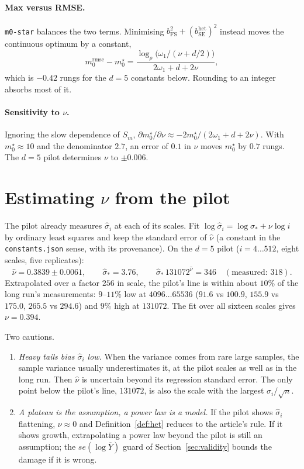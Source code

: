 \documentclass[11pt]{article}
\newcommand{\bSE}{b_{\mathrm{SE}}}
\newcommand{\bFS}{b_{\mathrm{FS}}}
\begin{document}
\paragraph{Max versus RMSE.} \texttt{m0-star} balances the two terms. Minimising
$\bFS^2+(\bSE^{\mathrm{het}})^2$ instead moves the continuous optimum by a
constant,
\[
  m_0^{\mathrm{rmse}}-m_0^\star=\frac{\log_\rho\bigl(\omega_1/(\nu+d/2)\bigr)}{2\omega_1+d+2\nu},
\]
which is $-0.42$ rungs for the $d=5$ constants below. Rounding to an integer
absorbs most of it.

\paragraph{Sensitivity to $\nu$.} Ignoring the slow dependence of $S_m$,
$\partial m_0^\star/\partial\nu\approx-2m_0^\star/(2\omega_1+d+2\nu)$. With
$m_0^\star\approx10$ and the denominator $2.7$, an error of $0.1$ in $\nu$ moves
$m_0^\star$ by $0.7$ rungs. The $d=5$ pilot determines $\nu$ to $\pm0.006$.

\section{Estimating \texorpdfstring{$\nu$}{nu} from the pilot}\label{sec:nu}

The pilot already measures $\hat\sigma_i$ at each of its scales. Fit
$\log\hat\sigma_i=\log\sigma_*+\nu\log i$ by ordinary least squares and keep
the standard error of $\hat\nu$ (a constant in the
\texttt{constants.json} sense, with its provenance). On the $d=5$ pilot
($i=4\ldots512$, eight scales, five replicates):
\[
  \hat\nu=0.3839\pm0.0061,\qquad\hat\sigma_*=3.76,\qquad
  \hat\sigma_*\,131072^{\hat\nu}=346\quad(\text{measured: }318).
\]
Extrapolated over a factor $256$ in scale, the pilot's line is within about
$10\%$ of the long run's measurements: $9$--$11\%$ low at $4096\ldots65536$
($91.6$ vs $100.9$, $155.9$ vs $175.0$, $265.5$ vs $294.6$) and $9\%$ high at
$131072$. The fit over all sixteen scales gives $\nu=0.394$.

Two cautions.
\begin{enumerate}
  \item \emph{Heavy tails bias $\hat\sigma_i$ low.} When the variance comes from
  rare large samples, the sample variance usually underestimates it, at the
  pilot scales as well as in the long run. Then $\hat\nu$ is uncertain beyond its
  regression standard error. The only point below the pilot's line, $131072$,
  is also the scale with the largest $\sigma_i/\sqrt n$.
  \item \emph{A plateau is the assumption, a power law is a model.} If the
  pilot shows $\hat\sigma_i$ flattening, $\nu\approx0$ and
  Definition~\ref{def:het} reduces to the article's rule. If it shows growth,
  extrapolating a power law beyond the pilot is still an assumption; the
  $se(\log\overline Y)$ guard of Section~\ref{sec:validity} bounds the damage
  if it is wrong.
\end{enumerate}
\end{document}
